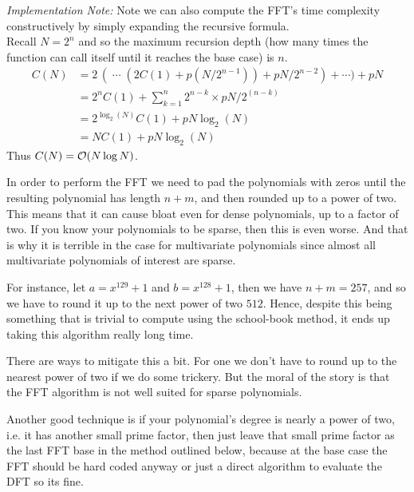 
\noindent\textit{Implementation Note: }
Note we can also compute the FFT's time complexity constructively by simply expanding the recursive formula.\\

Recall $N = 2^n$ and so the maximum recursion depth (how many times the function can call itself until it reaches the base case) is $n$.
\begin{align*}
C(N) &= 2\,(\;\cdots\; (2C(1) + p(N/2^{n-1})) + pN/2^{n-2}) + \cdots ) + pN\\
     &= 2^{n}C(1) + \sum^n_{k=1} 2^{n-k} \times pN/2^{(n-k)}\\
     &= 2^{\log_2(N)}C(1) + pN\log_2(N)\\
     &= NC(1) + pN\log_2(N)
\end{align*}
Thus $C(N) = \mathcal O(N \log N)$.

\begin{remark}
    In order to perform the FFT we need to pad the polynomials with zeros until the resulting polynomial has length $n + m$, and then rounded up to a power of two. This means that it can cause bloat even for dense polynomials, up to a factor of two. If you know your polynomials to be sparse, then this is even worse. And that is why it is terrible in the case for multivariate polynomials since almost all multivariate polynomials of interest are sparse.

    For instance, let $a = x^{129} + 1$ and $b = x^{128} + 1$, then we have $n + m = 257$, and so we have to round it up to the next power of two $512$. Hence, despite this being something that is trivial to compute using the school-book method, it ends up taking this algorithm really long time.

    There are ways to mitigate this a bit. For one we don't have to round up to the nearest power of two if we do some trickery. But the moral of the story is that the FFT algorithm is not well suited for sparse polynomials.

    Another good technique is if your polynomial's degree is nearly a power of two, i.e. it has another small prime factor, then just leave that small prime factor as the last FFT base in the method outlined below, because at the base case the FFT should be hard coded anyway or just a direct algorithm to evaluate the DFT so its fine.
\end{remark}

